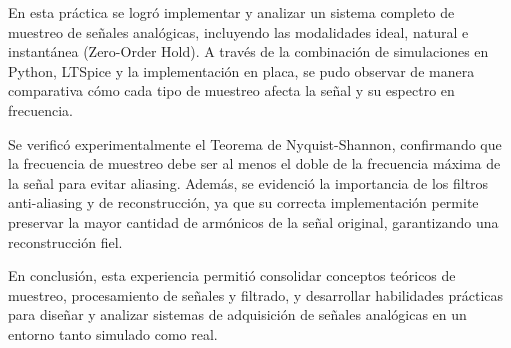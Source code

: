 En esta práctica se logró implementar y analizar un sistema 
completo de muestreo de señales analógicas, incluyendo las 
modalidades ideal, natural e instantánea (Zero-Order Hold). 
A través de la combinación de simulaciones en Python, LTSpice y 
la implementación en placa, se pudo observar de manera comparativa cómo 
cada tipo de muestreo afecta la señal y su espectro en frecuencia.

Se verificó experimentalmente el Teorema de Nyquist-Shannon, 
confirmando que la frecuencia de muestreo debe ser al menos el 
doble de la frecuencia máxima de la señal para evitar aliasing. 
Además, se evidenció la importancia de los filtros anti-aliasing y 
de reconstrucción, ya que su correcta implementación permite preservar 
la mayor cantidad de armónicos de la señal original, garantizando una 
reconstrucción fiel.


En conclusión, esta experiencia permitió consolidar conceptos teóricos de muestreo, 
procesamiento de señales y filtrado, y desarrollar habilidades prácticas para 
diseñar y analizar sistemas de adquisición de señales analógicas en un entorno 
tanto simulado como real.